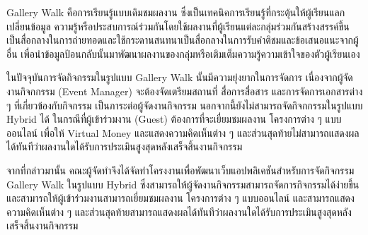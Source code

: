 \maketitle
\makesignature

\ifproject
    \begin{abstractTH}

        Gallery Walk คือการเรียนรู้แบบเดิมชมผลงาน ซึ่งเป็นเทคนิคการเรียนรู้ที่กระตุ้นให้ผู้เรียนแลกเปลี่ยนข้อมูล ความรู้หรือประสบการณ์ร่วมกันโดยใช้ผลงานที่ผู้เรียนแต่ละกลุ่มร่วมกันสร้างสรรค์ขึ้นเป็นสื่อกลางในการถ่ายทอดและใช้กระดานสนทนาเป็นสื่อกลางในการรับคำติชมและข้อเสนอแนะจากผู้อื่น เพื่อนำข้อมูลป้อนกลับนั้นมาพัฒนาผลงานของกลุ่มหรือเติมเต็มความรู้ความเข้าใจของตัวผู้เรียนเอง

        ในปัจจุบันการจัดกิจกรรมในรูปแบบ Gallery Walk นั้นมีความยุ่งยากในการจัดการ เนื่องจากผู้จัดงานกิจกกรรม (Event Manager) จะต้องจัดเตรียมสถานที่ สื่อการสื่อสาร และการจัดการเอกสารต่าง ๆ ที่เกี่ยวข้องกับกิจกรรม เป็นภาระต่อผู้จัดงานกิจกรรม นอกจากนี้ยังไม่สามารถจัดกิจกกรรมในรูปแบบ Hybrid ได้ ในกรณีที่ผู้เข้าร่วมงาน (Guest) ต้องการที่จะเยี่ยมชมผลงาน โครงการต่าง ๆ แบบออนไลน์ เพื่อให้ Virtual Money และแสดงความคิดเห็นต่าง ๆ และส่วนสุดท้ายไม่สามารถแสดงผลได้ทันทีว่าผลงานใดได้รับการประเมินสูงสุดหลังเสร็จสิ้นงานกิจกรรม

        จากที่กล่าวมานั้น คณะผู้จัดทำจึงได้จัดทำโครงงานเพื่อพัฒนาเว็บแอปพลิเคชันสำหรับการจัดกิจกรรม Gallery Walk ในรูปแบบ Hybrid ซึ่งสามารถให้ผู้จัดงานกิจกรรมสามารถจัดการกิจกรรมได้ง่ายขึ้น และสามารถให้ผู้เข้าร่วมงานสามารถเยี่ยมชมผลงาน โครงการต่าง ๆ แบบออนไลน์ และสามารถแสดงความคิดเห็นต่าง ๆ และส่วนสุดท้ายสามารถแสดงผลได้ทันทีว่าผลงานใดได้รับการประเมินสูงสุดหลังเสร็จสิ้นงานกิจกรรม
    \end{abstractTH}

